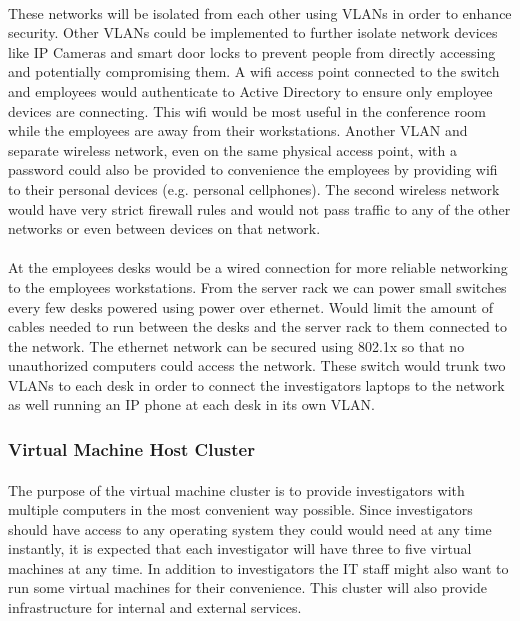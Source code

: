 \documentclass[12pt]{article}
\begin{document}
\paragraph{}
These networks will be isolated from each other using VLANs in order to enhance security.
Other VLANs could be implemented to further isolate network devices like IP Cameras and smart door locks to prevent people from directly accessing and potentially compromising them.
A wifi access point connected to the switch and employees would authenticate to Active Directory to ensure only employee devices are connecting.
This wifi would be most useful in the conference room while the employees are away from their workstations.
Another VLAN and separate wireless network, even on the same physical access point, with a password could also be provided to convenience the employees by providing wifi to their personal devices (e.g. personal cellphones).
The second wireless network would have very strict firewall rules and would not pass traffic to any of the other networks or even between devices on that network.
\paragraph{}
At the employees desks would be a wired connection for more reliable networking to the employees workstations. 
From the server rack we can power small switches every few desks powered using power over ethernet.
Would limit the amount of cables needed to run between the desks and the server rack to them connected to the network.
The ethernet network can be secured using 802.1x so that no unauthorized computers could access the network. 
These switch would trunk two VLANs to each desk in order to connect the investigators laptops to the network as well running an IP phone at each desk in its own VLAN.

\subsubsection{Virtual Machine Host Cluster}
\paragraph{}
The purpose of the virtual machine cluster is to provide investigators with multiple computers in the most convenient way possible.
Since investigators should have access to any operating system they could would need at any time instantly, it is expected that each investigator will have three to five virtual machines at any time.
In addition to investigators the IT staff might also want to run some virtual machines for their convenience.
This cluster will also provide infrastructure for internal and external services.
\end{document}
